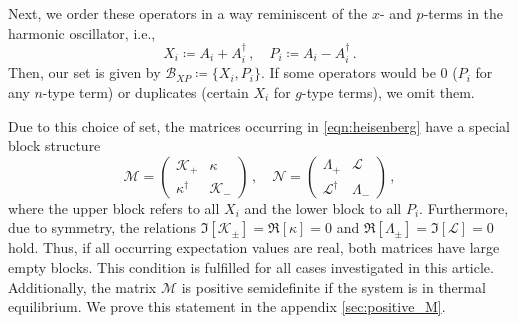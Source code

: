 \documentclass[
    reprint, 
    aps,
    preprintnumbers,
    twocolumn,
    prb,
    superscriptaddress
]{revtex4-2}
\newcommand{\mM}{\mathcal{M}}
\newcommand{\mN}{\mathcal{N}}
\begin{document}
Next, we order these operators in a way reminiscent of the $x$- and $p$-terms in the harmonic oscillator, i.e.,
\begin{equation}
    X_i \coloneqq  A_i + A_i^\dagger\,,\quad P_i \coloneqq  A_i - A_i^\dagger\,.
\end{equation}
Then, our set is given by $\mathcal{B}_{XP} \coloneqq \{ X_i, P_i \}$.
If some operators would be 0 ($P_i$ for any $n$-type term) or duplicates (certain $X_i$ for $g$-type terms), we omit them.

Due to this choice of set, the matrices occurring in \eqref{eqn:heisenberg} have a special block structure
\begin{equation}
    \label{eqn:xp_set}
    \mM = \begin{pmatrix}
        \mathcal{K}_+ & \kappa \\ \kappa^\dagger & \mathcal{K}_-
    \end{pmatrix}\,,\quad \mN = \begin{pmatrix}
        \Lambda_+ & \mathcal{L} \\ \mathcal{L}^\dagger & \Lambda_-
    \end{pmatrix}\,,
\end{equation}
where the upper block refers to all $X_i$ and the lower block to all $P_i$.
Furthermore, due to symmetry, the relations $\Im [\mathcal{K}_\pm] = \Re [\kappa] = 0$ and $\Re [\Lambda_\pm] = \Im [\mathcal{L}] = 0$ hold.
Thus, if all occurring expectation values are real, both matrices have large empty blocks.
This condition is fulfilled for all cases investigated in this article.
Additionally, the matrix $\mM$ is positive semidefinite if the system is in thermal equilibrium.
We prove this statement in the appendix \autoref{sec:positive_M}.
\end{document}
